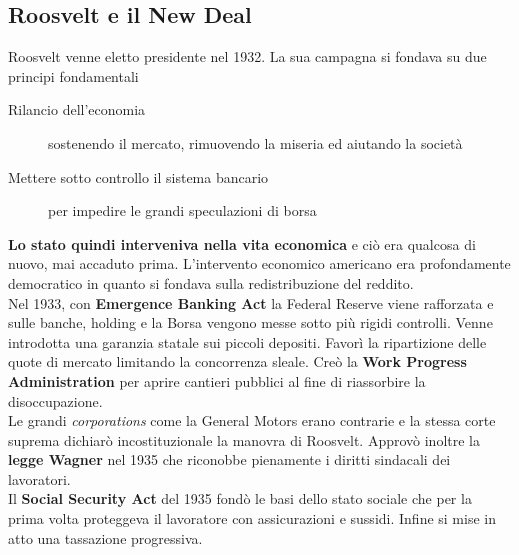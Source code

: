 \subsection{Roosvelt e il New Deal}
Roosvelt venne eletto presidente nel 1932. La sua campagna si fondava su due principi fondamentali
\begin{description}
  \item[Rilancio dell'economia] sostenendo il mercato, rimuovendo la miseria ed aiutando la società
  \item[Mettere sotto controllo il sistema bancario] per impedire le grandi speculazioni di borsa
\end{description}
\textbf{Lo stato quindi interveniva nella vita economica} e ciò era qualcosa di nuovo, mai accaduto
prima. L'intervento economico americano era profondamente democratico in quanto si fondava sulla
redistribuzione del reddito.\\
Nel 1933, con \textbf{Emergence Banking Act} la Federal Reserve viene rafforzata e sulle banche,
holding e la Borsa vengono messe sotto più rigidi controlli. Venne introdotta una garanzia
statale sui piccoli depositi. Favorì la ripartizione delle quote di mercato limitando la
concorrenza sleale. Creò la \textbf{Work Progress Administration} per aprire cantieri pubblici al
fine di riassorbire la disoccupazione.\\
Le grandi \textit{corporations} come la General Motors erano contrarie e la stessa corte suprema 
dichiarò incostituzionale la manovra di Roosvelt. Approvò inoltre la \textbf{legge Wagner} nel 1935
che riconobbe pienamente i diritti sindacali dei lavoratori.\\
Il \textbf{Social Security Act} del 1935 fondò le basi dello stato sociale che per la prima volta
proteggeva il lavoratore con assicurazioni e sussidi. Infine si mise in atto una tassazione 
progressiva.

